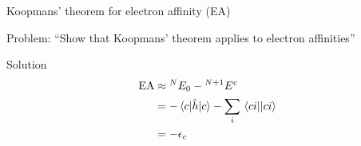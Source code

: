 \documentclass[aspectratio=169,9pt]{beamer}
\newcommand{\hh}{\Hat{h}}
\newcommand{\violet}[1]{\textcolor{hfViolet}{#1}}
\begin{document}
\begin{frame}{Koopmans' theorem for electron affinity (EA)}
	\begin{block}{Problem:}
		\violet{``Show that Koopmans' theorem applies to electron affinities''}
	\end{block}
	\pause
	\begin{block}{Solution}
		\begin{equation*}
		\begin{split}
			\text{EA} 
			& \approx {}^{N}E_0 - {}^{N+1} E^c
			\\
			& = - \mel{c}{\hh}{c} - \sum_{i} \mel{ci}{}{ci} 
			\\
			& = - \epsilon_c 
		\end{split}
		\end{equation*}

	\end{block}
\end{frame}
\end{document}
